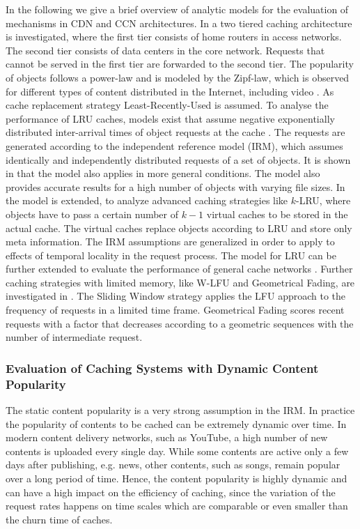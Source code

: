 In the following we give a brief overview of analytic models for the evaluation of mechanisms in CDN and CCN architectures.
In \cite{fricker2012impact} a two tiered caching architecture is investigated, where the first tier consists of home routers in access networks.
The second tier consists of data centers in the core network.
Requests that cannot be served in the first tier are forwarded to the second tier.
The popularity of objects follows a power-law and is modeled by the Zipf-law, which is observed for different types of content distributed in the Internet, including video \cite{gill2007youtube,cha2009analyzing}.
As cache replacement strategy Least-Recently-Used is assumed.
To analyse the performance of LRU caches, models exist that assume negative exponentially distributed inter-arrival times of object requests at the cache \cite{che2002hierarchical}.
The requests are generated according to the independent reference model (IRM), which assumes identically and independently distributed requests of a set of objects.
It is shown in \cite{fricker2012versatile} that the model also applies in more general conditions.
The model also provides accurate results for a high number of objects with varying file sizes.
In \cite{martina2014unified} the model is extended, to analyze advanced caching strategies like {$k$-LRU}, where objects have to pass a certain number of $k-1$ virtual caches to be stored in the actual cache.
The virtual caches replace objects according to LRU and store only meta information.
The IRM assumptions are generalized in order to apply to effects of temporal locality in the request process.
The model for LRU can be further extended to evaluate the performance of general cache networks \cite{rosensweig2010approximate, martina2014unified}.
Further caching strategies with limited memory, like W-LFU and Geometrical Fading, are investigated in \cite{hasslinger2014caching}.
The Sliding Window strategy applies the LFU approach to the frequency of requests in a limited time frame.
Geometrical Fading scores recent requests with a factor that decreases according to a geometric sequences with the number of intermediate request.

\subsubsection{Evaluation of Caching Systems with Dynamic Content Popularity}

The static content popularity is a very strong assumption in the IRM.
In practice the popularity of contents to be cached can be extremely dynamic over time.
In modern content delivery networks, such as YouTube, a high number of new contents is uploaded every single day.
While some contents are active only a few days after publishing, e.g. news, other contents, such as songs, remain popular over a long period of time.
Hence, the content popularity is highly dynamic and can have a high impact on the efficiency of caching, since the variation of the request rates happens on time scales which are comparable or even smaller than the churn time of caches.

